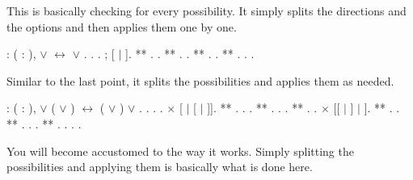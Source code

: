 
\begin{coqdoccode}
\end{coqdoccode}
This is basically checking for every possibility. It simply splits the directions and the options and then applies them one by one.

\begin{coqdoccode}
\coqdocnoindent
{}  : \coqdockw{\ensuremath{\forall}} ( : ),  \ensuremath{\lor}  \ensuremath{\leftrightarrow}  \ensuremath{\lor} .\coqdoceol
\coqdocnoindent
{}.\coqdoceol
\coqdocindent{1.00em}
  . ;  [ \ensuremath{|} ].\coqdoceol
\coqdocindent{2.00em}
** .  .\coqdoceol
\coqdocindent{2.00em}
** .  .\coqdoceol
\coqdocindent{2.00em}
** .  .\coqdoceol
\coqdocindent{2.00em}
** .  .\coqdoceol
\coqdocnoindent
{}.\coqdoceol
\coqdocemptyline
\end{coqdoccode}
Similar to the last point, it splits the possibilities and applies them as needed.

\begin{coqdoccode}
\coqdocemptyline
\coqdocnoindent
{}  : \coqdockw{\ensuremath{\forall}} (   : ),\coqdoceol
\coqdocindent{1.00em}
 \ensuremath{\lor}  ( \ensuremath{\lor} ) \ensuremath{\leftrightarrow} ( \ensuremath{\lor} ) \ensuremath{\lor} .\coqdoceol
\coqdocnoindent
{}.\coqdoceol
\coqdocindent{1.00em}
   . .\coqdoceol
\coqdocindent{1.00em}
\ensuremath{\times}  [ \ensuremath{|} [ \ensuremath{|} ]].\coqdoceol
\coqdocindent{2.00em}
** . .  .\coqdoceol
\coqdocindent{2.00em}
** . .  .\coqdoceol
\coqdocindent{2.00em}
** .  .\coqdoceol
\coqdocindent{1.00em}
\ensuremath{\times}  [[ \ensuremath{|} ] \ensuremath{|} ].\coqdoceol
\coqdocindent{2.00em}
** .  .\coqdoceol
\coqdocindent{2.00em}
** . .  .\coqdoceol
\coqdocindent{2.00em}
** . .  .\coqdoceol
\coqdocnoindent
{}.\coqdoceol
\coqdocemptyline
\end{coqdoccode}
You will become accustomed to the way it works. Simply splitting the possibilities and applying them is basically what is done here.

